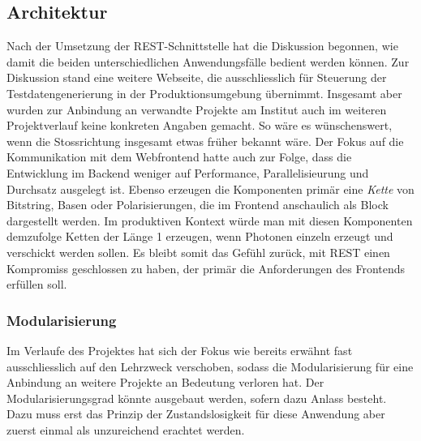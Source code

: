 \documentclass[a4paper,10.2pt,pdftex]{scrartcl}%
\begin{document}
\subsection{Architektur}
Nach der Umsetzung der REST-Schnittstelle hat die Diskussion begonnen, wie damit die beiden unterschiedlichen Anwendungsfälle bedient werden können. Zur Diskussion stand eine weitere Webseite, die ausschliesslich für Steuerung der Testdatengenerierung in der Produktionsumgebung übernimmt. Insgesamt aber wurden zur Anbindung an verwandte Projekte am Institut auch im weiteren Projektverlauf keine konkreten Angaben gemacht. So wäre es wünschenswert, wenn die Stossrichtung insgesamt etwas früher bekannt wäre. Der Fokus auf die Kommunikation mit dem Webfrontend hatte auch zur Folge, dass die Entwicklung im Backend weniger auf Performance, Parallelisieurung und Durchsatz ausgelegt ist. Ebenso erzeugen die Komponenten primär eine \emph{Kette} von Bitstring, Basen oder Polarisierungen, die im Frontend anschaulich als Block dargestellt werden. Im produktiven Kontext würde man mit diesen Komponenten demzufolge Ketten der Länge 1 erzeugen, wenn Photonen einzeln erzeugt und verschickt werden sollen. Es bleibt somit das Gefühl zurück, mit REST einen Kompromiss geschlossen zu haben, der primär die Anforderungen des Frontends erfüllen soll. 


\subsubsection{Modularisierung}
Im Verlaufe des Projektes hat sich der Fokus wie bereits erwähnt fast ausschliesslich auf den Lehrzweck verschoben, sodass die Modularisierung für eine Anbindung an weitere Projekte an Bedeutung verloren hat. Der Modularisierungsgrad könnte ausgebaut werden, sofern dazu Anlass besteht. Dazu muss erst das Prinzip der Zustandslosigkeit für diese Anwendung aber zuerst einmal als unzureichend erachtet werden.  
\end{document}
